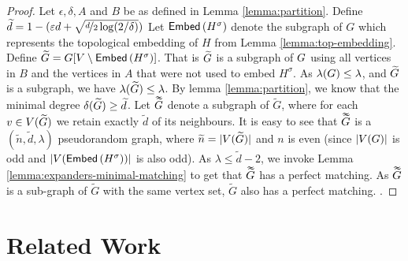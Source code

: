\documentclass[11pt]{article}
\newcommand{\Subdivision}[2]{{#1}^{#2}}
\newcommand{\MinimalDegree}[1]{\delta(#1)}
\newcommand{\dbtilde}[1]{\tilde{\raisebox{0pt}[0.85\height]{$\tilde{#1}$}}}
\newcommand{\ExpansionFactor}[1]{\lambda(#1)}
\begin{document}
\begin{proof}
Let $\epsilon, \delta, A$ and $B$ be as defined in Lemma \ref{lemma:partition}.
Define $\tilde{d} = 1 - (\epsilon d + \sqrt{\nicefrac{d}{2}\log (2/\delta)})$
Let $\Embedding{\Subdivision{H}{\sigma}}$ denote the subgraph of $G$ which represents the topological embedding of $H$ from Lemma \ref{lemma:top-embedding}.
Define $\tilde{G} = \Graph[V \setminus \Embedding{\Subdivision{H}{\sigma}}]$. 
That is $\tilde{\Graph}$ is a subgraph of $\Graph$ using all vertices in $B$ and the vertices in $A$ that were not used to embed $\Subdivision{H}{\sigma}$.
As $\ExpansionFactor{\Graph} \leq \lambda$, and $\tilde{\Graph}$ is a subgraph, we have $\ExpansionFactor{\tilde{\Graph}} \leq \lambda$.
By lemma \ref{lemma:partition}, we know that the minimal degree $\MinimalDegree{\tilde{\Graph}} \geq \tilde{d}$.
Let $\dbtilde{\Graph}$ denote a subgraph of $\tilde{G}$, where for each $v \in \Vertices{\tilde{\Graph}}$ we retain exactly $\tilde{d}$ of its neighbours.
It is easy to see that $\dbtilde{\Graph}$ is a $(\tilde{n}, \tilde{d}, \lambda)$ pseudorandom graph, where $\tilde{n} = |\Vertices{\tilde{\Graph}}|$ and $n$ is even (since $|\Vertices{\Graph}|$ is odd and $|\Vertices{\Embedding{\Subdivision{H}{\sigma}}}|$ is also odd). 
As $\lambda \leq \tilde{d} - 2$, we invoke Lemma \ref{lemma:expanders-minimal-matching} to get that $\dbtilde{G}$ has a perfect matching.
As $\dbtilde{G}$ is a sub-graph of $\tilde{G}$ with the same vertex set, $\tilde{G}$ also has a perfect matching.
.
\end{proof}

\section{Related Work}

\clearpage


\end{document}
